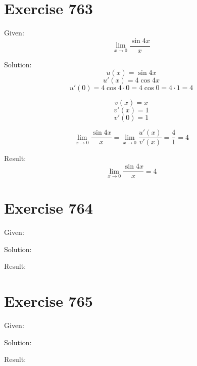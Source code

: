 \documentclass[a4paper, 10pt]{scrartcl}
\begin{document}
\section{Exercise 763}

Given:
\[\lim_{x\to 0}{\frac{\sin{4x}}{x}}\]

Solution:
\[u(x) = \sin{4x}\]
\[u'(x) = 4\cos{4x}\]
\[u'(0) = 4\cos{4\cdot 0} = 4\cos{0} = 4\cdot 1 = 4\]

\[v(x) = x\]
\[v'(x) = 1\]
\[v'(0) = 1\]

\[\lim_{x\to 0}{\frac{\sin{4x}}{x}} = \lim_{x\to 0}{\frac{u'(x)}{v'(x)}} = \frac{4}{1} = 4\]

Result:
\[\lim_{x\to 0}{\frac{\sin{4x}}{x}} = 4\]

\section{Exercise 764}

Given:

Solution:

Result:

\section{Exercise 765}

Given:

Solution:

Result:
\end{document}
